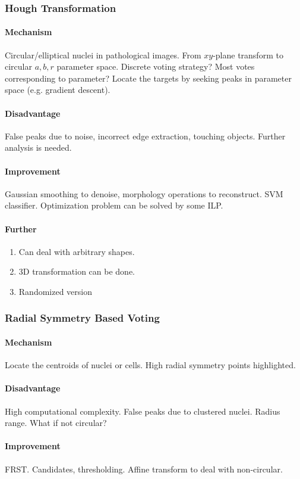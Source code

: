 \documentclass[10pt,a4paper]{article}
\begin{document}
\subsubsection{Hough Transformation}
\paragraph{Mechanism}
Circular/elliptical nuclei in pathological images. From $xy$-plane transform to circular $a,b,r$ parameter space. Discrete voting strategy? Most votes corresponding to parameter? Locate the targets by seeking peaks in parameter space (e.g. gradient descent). 
\paragraph{Disadvantage}
False peaks due to noise, incorrect edge extraction, touching objects. Further analysis is needed. 
\paragraph{Improvement}
Gaussian smoothing to denoise, morphology operations to reconstruct. SVM classifier. Optimization problem can be solved by some ILP.
\paragraph{Further}
\begin{enumerate}
	\item Can deal with arbitrary shapes. 
	\item 3D transformation can be done.
	\item Randomized version
\end{enumerate}

\subsubsection{Radial Symmetry Based Voting}
\paragraph{Mechanism}
Locate the centroids of nuclei or cells. High radial symmetry points highlighted.
\paragraph{Disadvantage}
High computational complexity. False peaks due to clustered nuclei. Radius range. What if not circular?
\paragraph{Improvement}
FRST. Candidates, thresholding. Affine transform to deal with non-circular.
\end{document}
